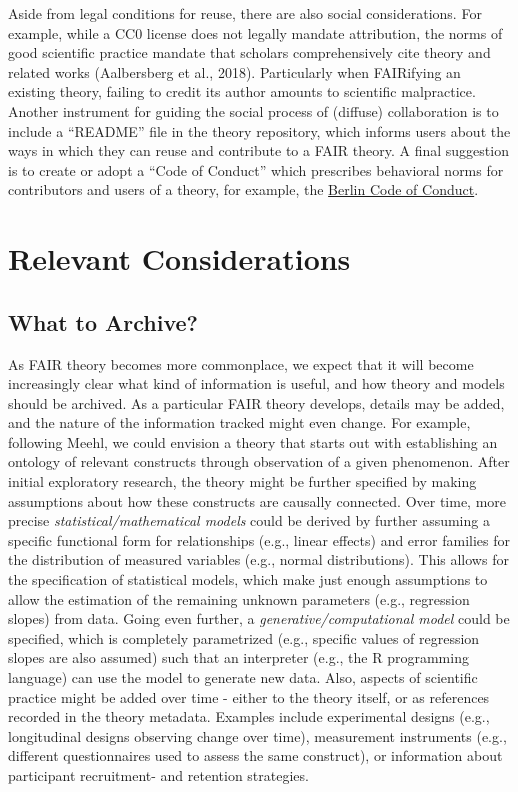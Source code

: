 \documentclass[
  man, noextraspace,floatsintext]{apa7}
\begin{document}
Aside from legal conditions for reuse, there are also social considerations.
For example, while a CC0 license does not legally mandate attribution,
the norms of good scientific practice mandate that scholars comprehensively cite theory and related works (Aalbersberg et al., 2018).
Particularly when FAIRifying an existing theory, failing to credit its author amounts to scientific malpractice.
Another instrument for guiding the social process of (diffuse) collaboration is to include a ``README'' file in the theory repository, which informs users about the ways in which they can reuse and contribute to a FAIR theory.
A final suggestion is to create or adopt a ``Code of Conduct'' which prescribes behavioral norms for contributors and users of a theory, for example, the \href{https://berlincodeofconduct.org/en}{Berlin Code of Conduct}.

\section{Relevant Considerations}\label{relevant-considerations}

\subsection{What to Archive?}\label{what-to-archive}

As FAIR theory becomes more commonplace,
we expect that it will become increasingly clear what kind of information is useful,
and how theory and models should be archived.
As a particular FAIR theory develops, details may be added, and the nature of the information tracked might even change.
For example, following Meehl, we could envision a theory that starts out with establishing an ontology of relevant constructs through observation of a given phenomenon.
After initial exploratory research, the theory might be further specified by making assumptions about how these constructs are causally connected.
Over time, more precise \emph{statistical/mathematical models} could be derived by further assuming a specific functional form for relationships (e.g., linear effects) and error families for the distribution of measured variables (e.g., normal distributions).
This allows for the specification of statistical models, which make just enough assumptions to allow the estimation of the remaining unknown parameters (e.g., regression slopes) from data.
Going even further, a \emph{generative/computational model} could be specified,
which is completely parametrized (e.g., specific values of regression slopes are also assumed) such that an interpreter (e.g., the R programming language) can use the model to generate new data.
Also, aspects of scientific practice might be added over time - either to the theory itself, or as references recorded in the theory metadata.
Examples include experimental designs (e.g., longitudinal designs observing change over time), measurement instruments (e.g., different questionnaires used to assess the same construct), or information about participant recruitment- and retention strategies.
\end{document}
